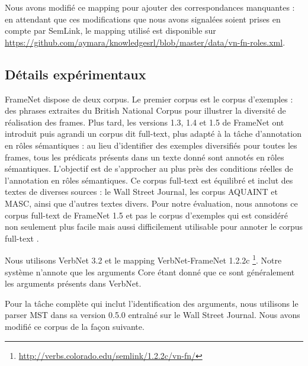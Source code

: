 Nous avons modifié ce mapping pour ajouter des correspondances manquantes : en
attendant que ces modifications que nous avons signalées soient prises en
compte par SemLink, le mapping utilisé est disponible sur
\url{https://github.com/aymara/knowledgesrl/blob/master/data/vn-fn-roles.xml}.


\subsection{Détails expérimentaux}
\label{subsec:details_exp}

FrameNet dispose de deux corpus. Le premier corpus est le corpus d'exemples :
des phrases extraites du British National Corpus pour illustrer la diversité de
réalisation des frames. Plus tard, les versions 1.3, 1.4 et 1.5 de FrameNet ont
introduit puis agrandi un corpus dit full-text, plus adapté à la tâche
d'annotation en rôles sémantiques : au lieu d'identifier des exemples
diversifiés pour toutes les frames, tous les prédicats présents dans un texte
donné sont annotés en rôles sémantiques. L'objectif est de s'approcher au plus
près des conditions réelles de l'annotation en rôles sémantiques. Ce corpus
full-text est équilibré et inclut des textes de diverses sources : le Wall
Street Journal, les corpus AQUAINT et MASC, ainsi que d'autres textes divers.
Pour notre évaluation, nous annotons ce corpus full-text de FrameNet 1.5 et pas
le corpus d'exemples qui est considéré non seulement plus facile mais aussi
difficilement utilisable pour annoter le corpus full-text
\citep[section~2.1]{das2010probabilistic}. 

Nous utilisons VerbNet 3.2 et le mapping VerbNet-FrameNet 1.2.2c
\footnote{\url{http://verbs.colorado.edu/semlink/1.2.2c/vn-fn/}}. Notre système
n'annote que les arguments Core étant donné que ce sont généralement les
arguments présents dans VerbNet.

Pour la tâche complète qui inclut l'identification des arguments, nous
utilisons le parser MST dans sa version 0.5.0 \citep{mcdonald2006multilingual}
entraîné sur le Wall Street Journal. Nous avons modifié ce corpus de la façon
suivante.

